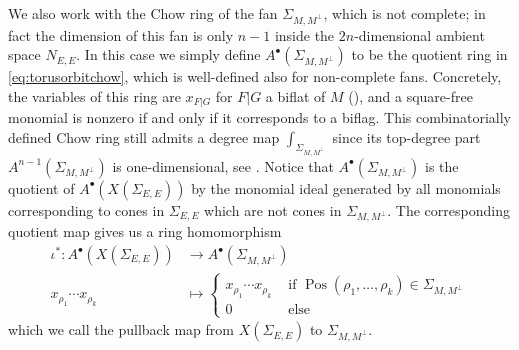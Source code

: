 \documentclass[12pt,a4paper,english]{scrartcl}
\DeclareMathOperator{\pos}{Pos}
\begin{document}
We also work with the Chow ring of the fan $\Sigma_{M,M^\perp}$, which is not complete; in fact the dimension of this fan is only $n-1$ inside the $2n$-dimensional ambient space $N_{E,E}$. In this case we simply define $A^\bullet(\Sigma_{M,M^\perp})$ to be the quotient ring in \eqref{eq:torusorbitchow}, which is well-defined also for non-complete fans. Concretely, the variables of this ring are $x_{F|G}$ for $F|G$ a biflat of $M$ (), and a square-free monomial is nonzero if and only if it corresponds to a biflag. This combinatorially defined Chow ring still admits a degree map $\int_{\Sigma_{M,M^\perp}}$ since its top-degree part $A^{n-1}(\Sigma_{M,M^\perp})$ is one-dimensional, see \cite[Proposition 3.7]{Ardila2022}.
Notice that $A^\bullet(\Sigma_{M,M^\perp})$ is the quotient of $A^\bullet(X(\Sigma_{E,E}))$ by the monomial ideal generated by all monomials corresponding to cones in $\Sigma_{E,E}$ which are not cones in $\Sigma_{M,M^\perp}$. The corresponding quotient map gives us a ring homomorphism
\begin{align}
\nonumber
\iota^*:A^\bullet(X(\Sigma_{E,E}))&\to A^\bullet(\Sigma_{M,M^\perp}) \\
x_{\rho_1}\cdots x_{\rho_k}&\mapsto \begin{cases}
   x_{\rho_1}\cdots x_{\rho_k} & \text{ if } \pos(\rho_1,\ldots,\rho_k) \in \Sigma_{M,M^\perp} \\
    0 & \text{ else}
\end{cases}
\end{align}
which we call the pullback map from $X(\Sigma_{E,E})$ to $\Sigma_{M,M^\perp}$. 
\end{document}
